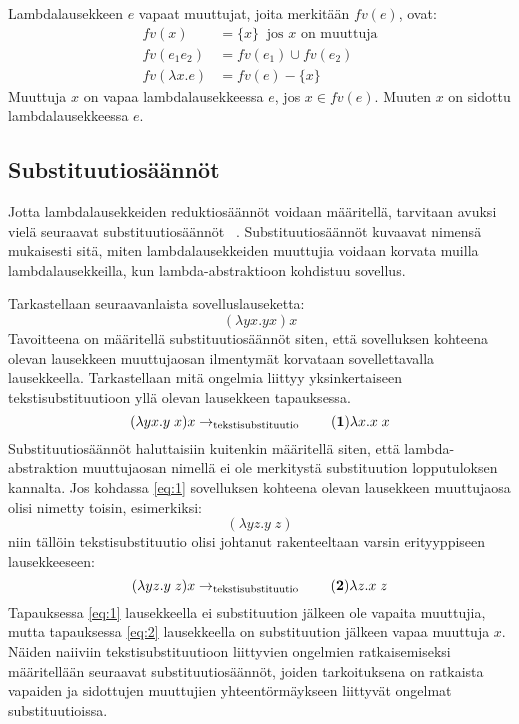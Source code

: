 \begin{maar}
Lambdalausekkeen $e$ vapaat muuttujat, joita merkitään $fv(e)$, ovat:
\begin{align*} 
fv(x) &= \{x\}\ \text{ jos } x \text{ on muuttuja} \\
fv(e_{1}e_{2}) &= fv(e_{1}) \cup fv(e_{2}) \\
fv(\lambda x.e) &= fv(e) - \{x\}
\end{align*}
Muuttuja $x$ on vapaa lambdalausekkeessa $e$, jos $x \in fv(e)$. Muuten $x$ on sidottu lambdalausekkeessa $e$.
\end{maar} 

\subsection{Substituutiosäännöt}
Jotta lambdalausekkeiden reduktiosäännöt voidaan määritellä, tarvitaan avuksi vielä seuraavat substituutiosäännöt ~\cite[s.~8]{Hudak89}. Substituutiosäännöt kuvaavat nimensä mukaisesti sitä, miten lambdalausekkeiden muuttujia voidaan korvata muilla lambdalausekkeilla, kun lambda-abstraktioon kohdistuu sovellus.
\par
Tarkastellaan seuraavanlaista sovelluslauseketta:
\[ (\lambda yx . yx) x \]
Tavoitteena on määritellä substituutiosäännöt siten, että sovelluksen kohteena olevan lausekkeen muuttujaosan ilmentymät korvataan sovellettavalla lausekkeella. Tarkastellaan mitä ongelmia liittyy yksinkertaiseen tekstisubstituutioon yllä olevan lausekkeen tapauksessa.
\[  
	(\lambda yx . y \; x) x  \rightarrow_{\text{tekstisubstituutio}} \label{eq:1} \tag{\textbf{1}}
	\lambda x . x \; x
\]
Substituutiosäännöt haluttaisiin kuitenkin määritellä siten, että lambda-abstraktion muuttujaosan nimellä ei ole merkitystä substituution lopputuloksen kannalta. Jos kohdassa \eqref{eq:1} sovelluksen kohteena olevan lausekkeen muuttujaosa olisi nimetty toisin, esimerkiksi:
\[  (\lambda yz . y \; z)  \]
niin tällöin tekstisubstituutio olisi johtanut rakenteeltaan varsin erityyppiseen lausekkeeseen:
\[  
	(\lambda yz . y \; z) x  \rightarrow_{\text{tekstisubstituutio}} \label{eq:2} \tag{\textbf{2}}
	\lambda z . x \; z
\]
Tapauksessa \eqref{eq:1} lausekkeella ei substituution jälkeen ole vapaita muuttujia, mutta tapauksessa \eqref{eq:2} lausekkeella on substituution jälkeen vapaa muuttuja $x$.
Näiden naiiviin tekstisubstituutioon liittyvien ongelmien ratkaisemiseksi määritellään seuraavat substituutiosäännöt, joiden tarkoituksena on ratkaista vapaiden ja sidottujen muuttujien yhteentörmäykseen liittyvät ongelmat substituutioissa.

